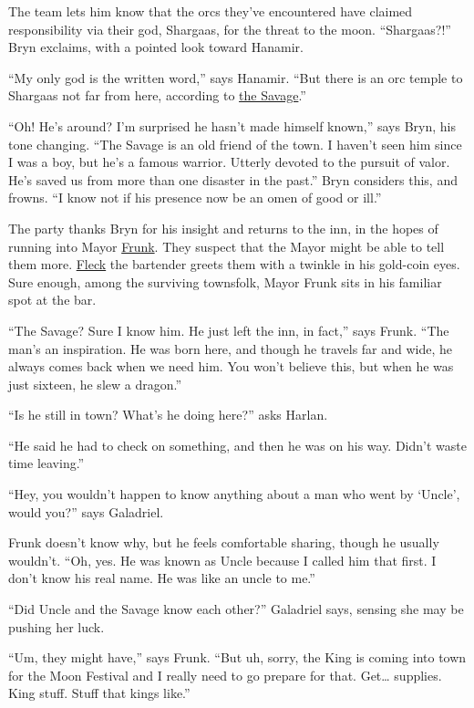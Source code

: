 \documentclass[smalldemyvopaper,11pt,twoside,onecolumn,openright,extrafontsizes]{memoir}
\begin{document}
The team lets him know that the orcs they've encountered have claimed
responsibility via their god, Shargaas, for the threat to the moon.
``Shargaas?!'' Bryn exclaims, with a pointed look toward Hanamir.

``My only god is the written word,'' says Hanamir. ``But there is an orc
temple to Shargaas not far from here, according to
\href{/characters/the-savage/}{the Savage}.''

``Oh! He's around? I'm surprised he hasn't made himself known,'' says
Bryn, his tone changing. ``The Savage is an old friend of the town. I
haven't seen him since I was a boy, but he's a famous warrior. Utterly
devoted to the pursuit of valor. He's saved us from more than one
disaster in the past.'' Bryn considers this, and frowns. ``I know not if
his presence now be an omen of good or ill.''

The party thanks Bryn for his insight and returns to the inn, in the
hopes of running into Mayor \href{/characters/frunk/}{Frunk}. They
suspect that the Mayor might be able to tell them more.
\href{/characters/fleck/}{Fleck} the bartender greets them with a
twinkle in his gold-coin eyes. Sure enough, among the surviving
townsfolk, Mayor Frunk sits in his familiar spot at the bar.

``The Savage? Sure I know him. He just left the inn, in fact,'' says
Frunk. ``The man's an inspiration. He was born here, and though he
travels far and wide, he always comes back when we need him. You won't
believe this, but when he was just sixteen, he slew a dragon.''

``Is he still in town? What's he doing here?'' asks Harlan.

``He said he had to check on something, and then he was on his way.
Didn't waste time leaving.''

``Hey, you wouldn't happen to know anything about a man who went by
`Uncle', would you?'' says Galadriel.

Frunk doesn't know why, but he feels comfortable sharing, though he
usually wouldn't. ``Oh, yes. He was known as Uncle because I called him
that first. I don't know his real name. He was like an uncle to me.''

``Did Uncle and the Savage know each other?'' Galadriel says, sensing
she may be pushing her luck.

``Um, they might have,'' says Frunk. ``But uh, sorry, the King is coming
into town for the Moon Festival and I really need to go prepare for
that. Get\ldots{} supplies. King stuff. Stuff that kings like.''
\end{document}
